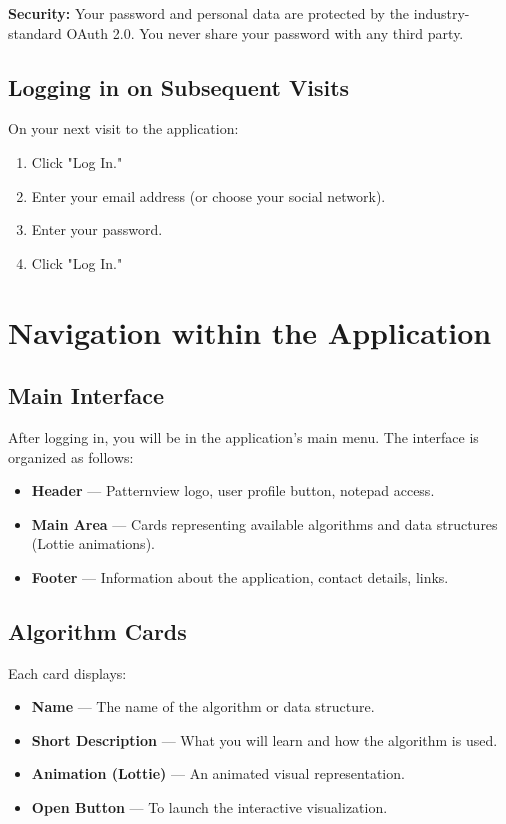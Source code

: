 \textbf{Security:} Your password and personal data are protected by the industry-standard OAuth 2.0. You never share your password with any third party.

\subsection{Logging in on Subsequent Visits}

On your next visit to the application:
\begin{enumerate}
  \item Click "Log In."
  \item Enter your email address (or choose your social network).
  \item Enter your password.
  \item Click "Log In."
\end{enumerate}

\section{Navigation within the Application}

\subsection{Main Interface}

After logging in, you will be in the application's main menu. The interface is organized as follows:

\begin{itemize}
  \item \textbf{Header} — Patternview logo, user profile button, notepad access.
  \item \textbf{Main Area} — Cards representing available algorithms and data structures (Lottie animations).
  \item \textbf{Footer} — Information about the application, contact details, links.
\end{itemize}

\subsection{Algorithm Cards}

Each card displays:
\begin{itemize}
  \item \textbf{Name} — The name of the algorithm or data structure.
  \item \textbf{Short Description} — What you will learn and how the algorithm is used.
  \item \textbf{Animation (Lottie)} — An animated visual representation.
  \item \textbf{Open Button} — To launch the interactive visualization.
\end{itemize}

